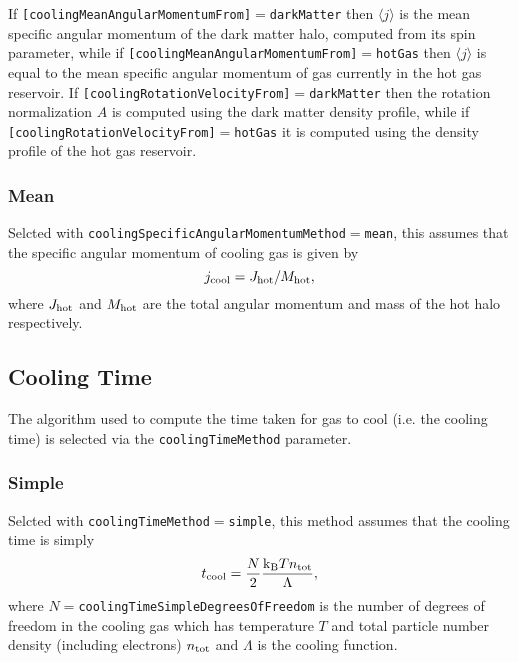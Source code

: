 If {\tt [coolingMeanAngularMomentumFrom]}$=${\tt darkMatter} then $\langle j \rangle$ is the mean specific angular momentum of the dark matter halo, computed from its spin parameter, while if {\tt [coolingMeanAngularMomentumFrom]}$=${\tt hotGas} then $\langle j \rangle$ is equal to the mean specific angular momentum of gas currently in the hot gas reservoir. If {\tt [coolingRotationVelocityFrom]}$=${\tt darkMatter} then the rotation normalization $A$ is computed using the dark matter density profile, while if {\tt [coolingRotationVelocityFrom]}$=${\tt hotGas} it is computed using the density profile of the hot gas reservoir.

\subsubsection{Mean}

Selcted with {\tt coolingSpecificAngularMomentumMethod}$=${\tt mean}, this assumes that the specific angular momentum of cooling gas is given by
\begin{equation}
 j_{\rm cool} = J_{\rm hot}/M_{\rm hot},
\end{equation}
where $J_{\rm hot}$ and $M_{\rm hot}$ are the total angular momentum and mass of the hot halo respectively.

\subsection{Cooling Time}\label{sec:CoolingTime}

The algorithm used to compute the time taken for gas to cool (i.e. the cooling time) is selected via the {\tt coolingTimeMethod} parameter.

\subsubsection{Simple}

Selcted with {\tt coolingTimeMethod}$=${\tt simple}, this method assumes that the cooling time is simply
\begin{equation}
 t_{\rm cool} = {N \over 2} {{\rm k}_{\rm B} T n_{\rm tot} \over \Lambda},
\end{equation}
where $N=${\tt coolingTimeSimpleDegreesOfFreedom} is the number of degrees of freedom in the cooling gas which has temperature $T$ and total particle number density (including electrons) $n_{\rm tot}$ and $\Lambda$ is the cooling function.

